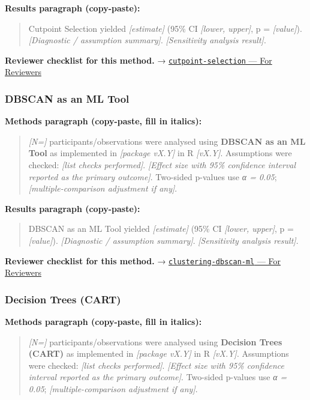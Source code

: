 \documentclass[
]{article}
\begin{document}
\textbf{Results paragraph (copy-paste):}

\begin{quote}
Cutpoint Selection yielded \emph{{[}estimate{]}} (95\% CI
\emph{{[}lower, upper{]}}, p = \emph{{[}value{]}}). \emph{{[}Diagnostic
/ assumption summary{]}}. \emph{{[}Sensitivity analysis result{]}}.
\end{quote}

\textbf{Reviewer checklist for this method.} →
\href{../chapters/14-clinical/cutpoint-selection.Rmd\#for-reviewers}{\texttt{cutpoint-selection}
--- For Reviewers}

\subsubsection{DBSCAN as an ML Tool}\label{dbscan-as-an-ml-tool}

\textbf{Methods paragraph (copy-paste, fill in italics):}

\begin{quote}
\emph{{[}N={]}} participants/observations were analysed using
\textbf{DBSCAN as an ML Tool} as implemented in \emph{{[}package
vX.Y{]}} in R \emph{{[}vX.Y{]}}. Assumptions were checked: \emph{{[}list
checks performed{]}}. \emph{{[}Effect size with 95\% confidence interval
reported as the primary outcome{]}}. Two-sided p-values use \emph{α =
0.05}; \emph{{[}multiple-comparison adjustment if any{]}}.
\end{quote}

\textbf{Results paragraph (copy-paste):}

\begin{quote}
DBSCAN as an ML Tool yielded \emph{{[}estimate{]}} (95\% CI
\emph{{[}lower, upper{]}}, p = \emph{{[}value{]}}). \emph{{[}Diagnostic
/ assumption summary{]}}. \emph{{[}Sensitivity analysis result{]}}.
\end{quote}

\textbf{Reviewer checklist for this method.} →
\href{../chapters/13-ml/clustering-dbscan-ml.Rmd\#for-reviewers}{\texttt{clustering-dbscan-ml}
--- For Reviewers}

\subsubsection{Decision Trees (CART)}\label{decision-trees-cart}

\textbf{Methods paragraph (copy-paste, fill in italics):}

\begin{quote}
\emph{{[}N={]}} participants/observations were analysed using
\textbf{Decision Trees (CART)} as implemented in \emph{{[}package
vX.Y{]}} in R \emph{{[}vX.Y{]}}. Assumptions were checked: \emph{{[}list
checks performed{]}}. \emph{{[}Effect size with 95\% confidence interval
reported as the primary outcome{]}}. Two-sided p-values use \emph{α =
0.05}; \emph{{[}multiple-comparison adjustment if any{]}}.
\end{quote}
\end{document}
